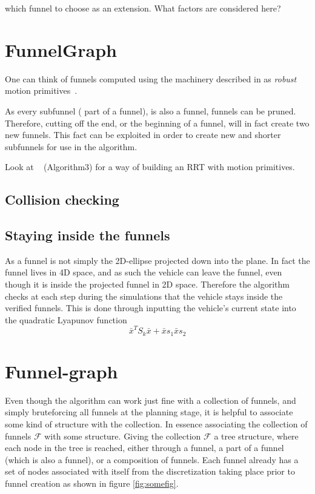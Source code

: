 \ie which funnel to choose as an extension. What factors are considered here?

\section{FunnelGraph}

One can think of funnels computed using the machinery described in
\cite[sec~4]{majumdarFunnelLibrariesRealtime2017} as \textit{robust} motion
primitives~\cite{majumdarFunnelLibrariesRealtime2017}.

As every subfunnel (\ie{} part of a funnel), is also a funnel, funnels can be
pruned. Therefore, cutting off the end, or the beginning of a funnel, will in
fact create two new funnels. This fact can be exploited in order to create new
and shorter subfunnels for use in the \rrtfunnel{} algorithm.

Look at ~\cite{vonasekGlobalMotionPlanning2013} (Algorithm3) for a way of
building an RRT with motion primitives.

\subsection{Collision checking}

\subsection{Staying inside the funnels}

As a funnel is not simply the 2D-ellipse projected down into the plane. In fact
the funnel lives in 4D space, and as such the vehicle can leave the funnel, even
though it is inside the projected funnel in 2D space. Therefore the \rrtfunnel{}
algorithm checks at each step during the simulations that the vehicle stays
inside the verified funnels. This is done through inputting the vehicle's
current state into the quadratic Lyapunov function
\[
  {\bar{x}}^{T}S_{k}\bar{x} + \bar{x}s_{1} \bar{x} s_{2}
\]

\section{Funnel-graph}

Even though the \rrtfunnel{} algorithm can work just fine with a collection of
funnels, and simply bruteforcing all funnels at the planning stage, it is
helpful to associate some kind of structure with the collection. In essence
associating the collection of funnels \(\mathcal{F}\) with some structure.
Giving the collection \(\mathcal{F}\) a tree structure, where each node in the
tree is reached, either through a funnel, a part of a funnel (which is also a
funnel), or a composition of funnels. Each funnel already has a set of nodes
associated with itself from the discretization taking place prior to funnel
creation as shown in figure \ref{fig:somefig}.

